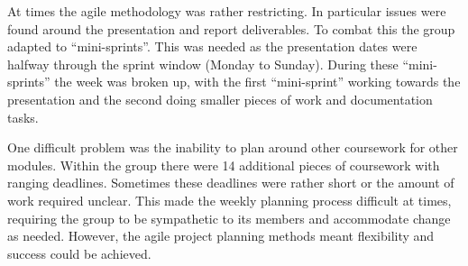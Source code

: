 At times the agile methodology was rather restricting. In particular issues were found around the presentation and report deliverables. To combat this the group adapted to ``mini-sprints''. This was needed as the presentation dates were halfway through the sprint window (Monday to Sunday). During these ``mini-sprints'' the week was broken up, with the first ``mini-sprint'' working towards the presentation and the second doing smaller pieces of work and documentation tasks.

One difficult problem was the inability to plan around other coursework for other modules. Within the group there were 14 additional pieces of coursework with ranging deadlines. Sometimes these deadlines were rather short or the amount of work required unclear. This made the weekly planning process difficult at times, requiring the group to be sympathetic to its members and accommodate change as needed. However, the agile project planning methods meant flexibility and success could be achieved.
